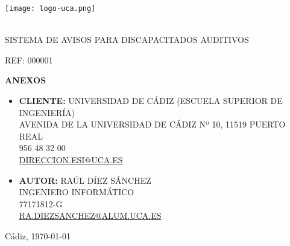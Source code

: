 \thispagestyle{empty}
\normalsize
\mdseries
\begin{center}

  \texttt{[image: logo-uca.png]} \\\

  \vspace{1.5cm}

  \huge{SISTEMA DE AVISOS PARA DISCAPACITADOS AUDITIVOS} \\
  
  \vspace{0.6cm}

  \large{REF: 000001} \\
  
  \vspace{1.0cm}

  \Huge{\textbf{ANEXOS}} \\

  \vspace{2.5cm}
  

\end{center}
\begin{itemize}
\item {\textbf{CLIENTE:} UNIVERSIDAD DE CÁDIZ (ESCUELA SUPERIOR DE INGENIERÍA)\\
            AVENIDA DE LA UNIVERSIDAD DE CÁDIZ Nº 10, 11519 PUERTO REAL\\
            956 48 32 00\\
            \underline{DIRECCION.ESI@UCA.ES}
            }
            \vspace{0.5cm}
\item {\textbf{AUTOR:} RAÚL DÍEZ SÁNCHEZ\\
            INGENIERO INFORMÁTICO\\
            77171812-G\\
            \underline{RA.DIEZSANCHEZ@ALUM.UCA.ES}}
\end{itemize}

\vspace{0.2cm}

\begin{flushright}
  \large{Cádiz, \today} \\
\end{flushright}
